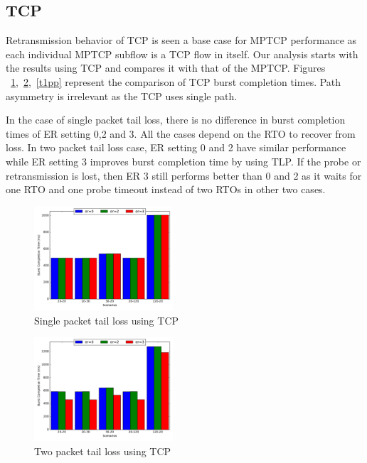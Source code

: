 \documentclass[10pt,draftcls,twocolumn]{IEEEconf}
\begin{document}
\subsection{TCP}
Retransmission behavior of TCP is seen a base case for MPTCP performance as each individual MPTCP subflow is a TCP flow in itself. Our analysis
starts with the results using TCP and compares it with that of the MPTCP. Figures ~\ref{t1p},~\ref{t2p},~\ref{t1pp} represent the comparison of TCP 
burst completion times. Path asymmetry is irrelevant as the TCP uses single path.

In the case of single packet tail loss, there is no difference in burst completion times of ER setting 0,2 and 3. All the cases depend on the RTO
to recover from loss. In two packet tail loss case, ER setting 0 and 2 have similar performance while ER setting 3 improves burst completion time
by using TLP. If the probe or retransmission is lost, then ER 3 still performs better than 0 and 2 as it waits for one RTO and one probe timeout
instead of two RTOs in other two cases.

\begin{figure}[!ht]
\begin{center}
\includegraphics[angle=0, width=0.46\textwidth,natwidth=578.16,natheight=433.62]{plots/T1P.pdf}
\caption{Single packet tail loss using TCP}\label{t1p}
\end{center}
\end{figure}



\begin{figure}[!ht]
\begin{center}
\includegraphics[angle=0, width=0.46\textwidth,natwidth=578.16,natheight=433.62]{plots/T2P.pdf}
\caption{Two packet tail loss using TCP}\label{t2p}
\end{center}
\end{figure}
\end{document}
